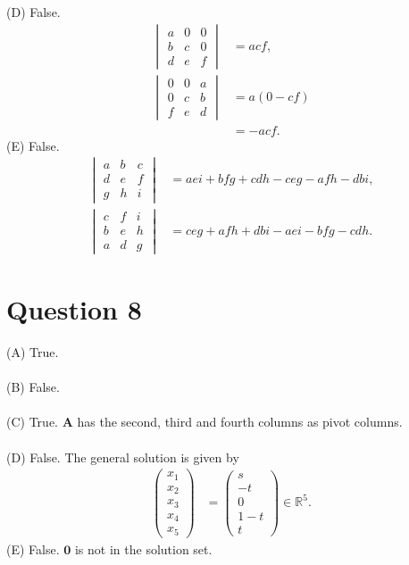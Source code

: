\documentclass{article}
\begin{document}
(D) False.
\begin{align*}
    \begin{vmatrix} 
    a & 0 & 0 \\ 
    b & c & 0 \\ 
    d & e & f
    \end{vmatrix}
    &= acf, \\
    \begin{vmatrix} 
    0 & 0 & a \\ 
    0 & c & b \\ 
    f & e & d
    \end{vmatrix} 
    &= a (0 - cf) \\
    &= - acf.
\end{align*}
(E) False.
\begin{align*}
    \begin{vmatrix} 
    a & b & c \\ 
    d & e & f \\ 
    g & h & i
    \end{vmatrix}
    &= aei+bfg+cdh-ceg-afh-dbi, \\
    \begin{vmatrix} 
    c & f & i \\ 
    b & e & h \\ 
    a & d & g
    \end{vmatrix} 
    & = ceg+afh+dbi-aei-bfg-cdh.
\end{align*}


\section*{Question 8}
(A) True. \\\\
(B) False. \\\\
(C) True. $\mathbf{A}$ has the second, third and fourth columns as pivot columns. \\\\
(D) False.
The general solution is given by
\begin{align*}
\begin{pmatrix}
    x_1 \\
    x_2 \\
    x_3 \\
    x_4 \\
    x_5
\end{pmatrix}
&=
\begin{pmatrix}
    s \\
    -t \\
    0 \\
    1 - t \\
    t
\end{pmatrix} \in \mathbb{R}^5.
\end{align*}
(E) False. $\mathbf{0}$ is not in the solution set. 
\end{document}

